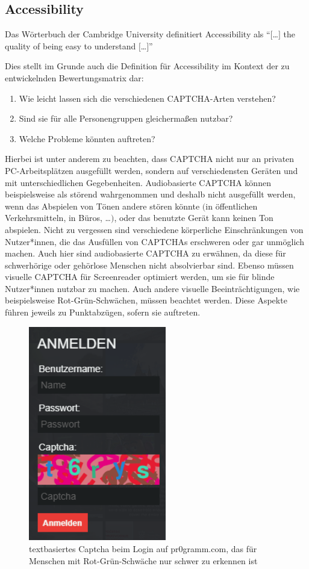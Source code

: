 \subsection{Accessibility}
\label{ch:matrix:aspekte:accessibility}
Das Wörterbuch der Cambridge University definitiert Accessibility als ``$[$\dots$]$ the quality of being easy to understand $[$\dots$]$'' \cite{CACD:2008}

Dies stellt im Grunde auch die Definition für Accessibility im Kontext der zu entwickelnden Bewertungsmatrix dar:

\begin{enumerate}
\item Wie leicht lassen sich die verschiedenen CAPTCHA-Arten verstehen?
\item Sind sie für alle Personengruppen gleichermaßen nutzbar?
\item Welche Probleme könnten auftreten?
\end{enumerate}

Hierbei ist unter anderem zu beachten, dass CAPTCHA nicht nur an privaten PC-Arbeitsplätzen ausgefüllt werden,
sondern auf verschiedensten Geräten und mit unterschiedlichen Gegebenheiten.
Audiobasierte CAPTCHA können beispielsweise als störend wahrgenommen und deshalb nicht ausgefüllt werden,
wenn das Abspielen von Tönen andere stören könnte $($in öffentlichen Verkehrsmitteln, in Büros, \dots$)$,
oder das benutzte Gerät kann keinen Ton abspielen.
Nicht zu vergessen sind verschiedene körperliche Einschränkungen von Nutzer*innen,
die das Ausfüllen von CAPTCHAs erschweren oder gar unmöglich machen. Auch hier sind audiobasierte CAPTCHA zu erwähnen,
da diese für schwerhörige oder gehörlose Menschen nicht absolvierbar sind.
Ebenso müssen visuelle CAPTCHA für Screenreader optimiert werden, um sie für blinde Nutzer*innen nutzbar zu machen.
Auch andere visuelle Beeinträchtigungen, wie beispielsweise Rot-Grün-Schwächen, müssen beachtet werden.
Diese Aspekte führen jeweils zu Punktabzügen, sofern sie auftreten.

\begin{figure}[h!]
    \centering
    \includegraphics[width=6cm]{gfx/mygraphics/pr0grammcaptcha.png}
    \caption{textbasiertes Captcha beim Login auf pr$0$gramm.com, das für Menschen mit Rot-Grün-Schwäche nur schwer zu erkennen ist}
\end{figure}

